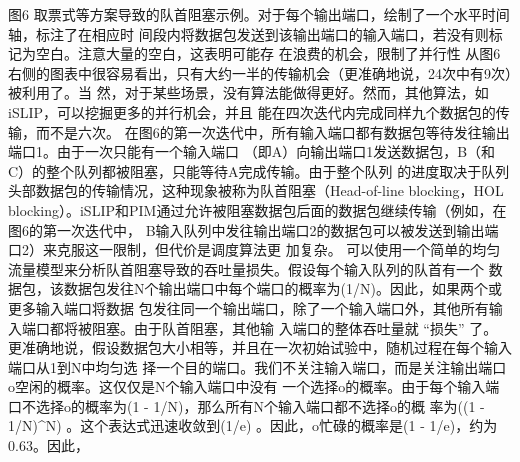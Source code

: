 图6 取票式等方案导致的队首阻塞示例。对于每个输出端口，绘制了一个水平时间轴，标注了在相应时
间段内将数据包发送到该输出端口的输入端口，若没有则标记为空白。注意大量的空白，这表明可能存
在浪费的机会，限制了并行性
从图6右侧的图表中很容易看出，只有大约一半的传输机会（更准确地说，24次中有9次）被利用了。当
然，对于某些场景，没有算法能做得更好。然而，其他算法，如iSLIP，可以挖掘更多的并行机会，并且
能在四次迭代内完成同样九个数据包的传输，而不是六次。
在图6的第一次迭代中，所有输入端口都有数据包等待发往输出端口1。由于一次只能有一个输入端口
（即A）向输出端口1发送数据包，B（和C）的整个队列都被阻塞，只能等待A完成传输。由于整个队列
的进度取决于队列头部数据包的传输情况，这种现象被称为队首阻塞（Head-of-line blocking，HOL
blocking）。iSLIP和PIM通过允许被阻塞数据包后面的数据包继续传输（例如，在图6的第一次迭代中，
B输入队列中发往输出端口2的数据包可以被发送到输出端口2）来克服这一限制，但代价是调度算法更
加复杂。
可以使用一个简单的均匀流量模型来分析队首阻塞导致的吞吐量损失。假设每个输入队列的队首有一个
数据包，该数据包发往N个输出端口中每个端口的概率为(1/N)。因此，如果两个或更多输入端口将数据
包发往同一个输出端口，除了一个输入端口外，其他所有输入端口都将被阻塞。由于队首阻塞，其他输
入端口的整体吞吐量就 “损失” 了。
更准确地说，假设数据包大小相等，并且在一次初始试验中，随机过程在每个输入端口从1到N中均匀选
择一个目的端口。我们不关注输入端口，而是关注输出端口o空闲的概率。这仅仅是N个输入端口中没有
一个选择o的概率。由于每个输入端口不选择o的概率为(1 - 1/N)，那么所有N个输入端口都不选择o的概
率为((1 - 1/N)^N) 。这个表达式迅速收敛到(1/e) 。因此，o忙碌的概率是(1 - 1/e)，约为0.63。因此，


